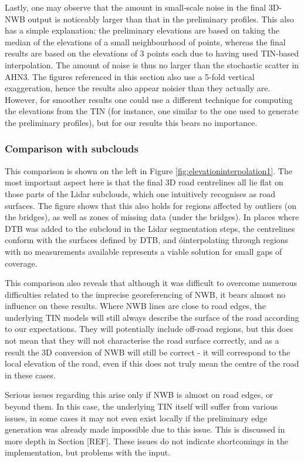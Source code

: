 Lastly, one may observe that the amount in small-scale noise in the final 3D-NWB output is noticeably larger than that in the preliminary profiles. This also has a simple explanation: the preliminary elevations are based on taking the median of the elevations of a small neighbourhood of points, whereas the final results are based on the elevations of 3 points each due to having used TIN-based interpolation. The amount of noise is thus no larger than the stochastic scatter in AHN3. The figures referenced in this section also use a 5-fold vertical exaggeration, hence the results also appear noisier than they actually are. However, for smoother results one could use a different technique for computing the elevations from the TIN (for instance, one similar to the one used to generate the preliminary profiles), but for our results this bears no importance.

\subsubsection{Comparison with subclouds}

This comparison is shown on the left in Figure \ref{fig:elevationinterpolation1}. The most important aspect here is that the final 3D road centrelines all lie flat on those parts of the Lidar subclouds, which one intuitively recognises as road surfaces. The figure shows that this also holds for regions affected by outliers (on the bridges), as well as zones of missing data (under the bridges). In places where DTB was added to the subcloud in the Lidar segmentation steps, the centrelines conform with the surfaces defined by DTB, and óinterpolating through regions with no measurements available represents a viable solution for small gaps of coverage.

This comparison also reveals that although it was difficult to overcome numerous difficulties related to the imprecise georeferencing of NWB, it bears almost no influence on these results. Where NWB lines are close to road edges, the underlying TIN models will still always describe the surface of the road according to our expectations. They will potentially include off-road regions, but this does not mean that they will not characterise the road surface correctly, and as a result the 3D conversion of NWB will still be correct - it will correspond to the local elevation of the road, even if this does not truly mean the centre of the road in these cases.

Serious issues regarding this arise only if NWB is almost on road edges, or beyond them. In this case, the underlying TIN itself will suffer from various issues, in some cases it may not even exist locally if the preliminary edge generation was already made impossible due to this issue. This is discussed in more depth in Section [REF]. These issues do not indicate shortcomings in the implementation, but problems with the input.

